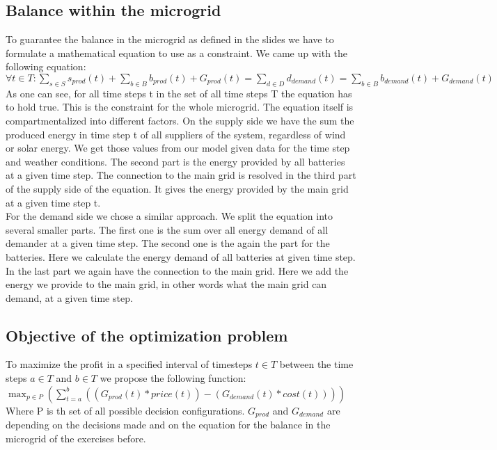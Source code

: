 \subsection{Balance within the microgrid}
To guarantee the balance in the microgrid as defined in the slides we have to formulate a mathematical equation to use as a constraint.
We came up with the following equation:\\
$\forall t \in T: \sum_{s \in S}{s_{prod}(t)} + \sum_{b \in B}{b_{prod}(t)} + G_{prod}(t) = \sum_{d \in D}{d_{demand}(t)} = \sum_{b \in B}{b_{demand}(t)} + G_{demand}(t)$\\
As one can see, for all time steps t in the set of all time steps T the equation has to hold true.
This is the constraint for the whole microgrid.
The equation itself is compartmentalized into different factors.
On the supply side we have the sum the produced energy in time step t of all suppliers of the system, regardless of wind or solar energy.
We get those values from our model given data for the time step and weather conditions.
The second part is the energy provided by all batteries at a given time step.
The connection to the main grid is resolved in the third part of the supply side of the equation.
It gives the energy provided by the main grid at a given time step t.\\
For the demand side we chose a similar  approach.
We split the equation into several smaller parts.
The first one is the sum over all energy demand of all  demander at a given time step.
The second one is the again the part for the batteries.
Here we calculate the energy demand of all batteries at given time step.
In the last part we again have the connection to the main grid.
Here we add the energy we provide to the main grid, in other words what the main grid can demand, at a given time step.\\
\subsection{Objective of the optimization problem}
To maximize the profit in a specified interval of timesteps $t \in T$ between the time steps $a \in T$ and $b \in T$ we propose the following function:\\
$\max_{p \in P}{(\sum_{t=a}^{b}{((G_{prod}(t)*price(t))-(G_{demand}(t)*cost(t)))})}$\\
Where P is th set of all possible decision configurations. $G_{prod}$ and $G_{demand}$ are depending on the decisions made and on the equation for the balance in the microgrid of the exercises before.
